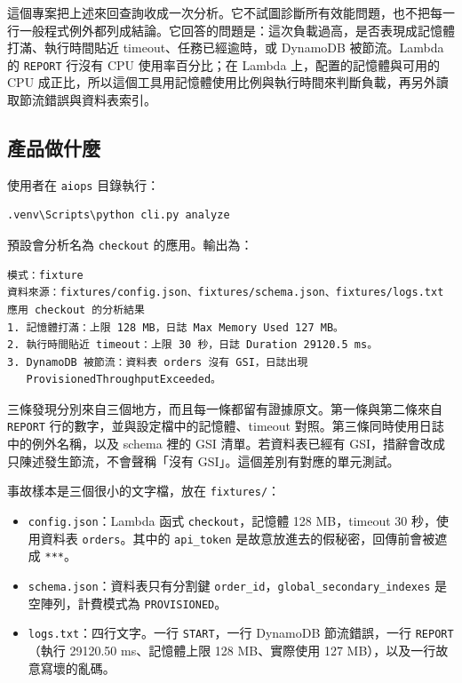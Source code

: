 \documentclass[11pt]{article}
\begin{document}
這個專案把上述來回查詢收成一次分析。它不試圖診斷所有效能問題，也不把每一行一般程式例外都列成結論。它回答的問題是：這次負載過高，是否表現成記憶體打滿、執行時間貼近 timeout、任務已經逾時，或 DynamoDB 被節流。Lambda 的 \texttt{REPORT} 行沒有 CPU 使用率百分比；在 Lambda 上，配置的記憶體與可用的 CPU 成正比，所以這個工具用記憶體使用比例與執行時間來判斷負載，再另外讀取節流錯誤與資料表索引。

\subsection{產品做什麼}

使用者在 \texttt{aiops} 目錄執行：

\begin{verbatim}
.venv\Scripts\python cli.py analyze
\end{verbatim}

預設會分析名為 \texttt{checkout} 的應用。輸出為：

\begin{verbatim}
模式：fixture
資料來源：fixtures/config.json、fixtures/schema.json、fixtures/logs.txt
應用 checkout 的分析結果
1. 記憶體打滿：上限 128 MB，日誌 Max Memory Used 127 MB。
2. 執行時間貼近 timeout：上限 30 秒，日誌 Duration 29120.5 ms。
3. DynamoDB 被節流：資料表 orders 沒有 GSI，日誌出現
   ProvisionedThroughputExceeded。
\end{verbatim}

三條發現分別來自三個地方，而且每一條都留有證據原文。第一條與第二條來自 \texttt{REPORT} 行的數字，並與設定檔中的記憶體、timeout 對照。第三條同時使用日誌中的例外名稱，以及 schema 裡的 GSI 清單。若資料表已經有 GSI，措辭會改成只陳述發生節流，不會聲稱「沒有 GSI」。這個差別有對應的單元測試。

事故樣本是三個很小的文字檔，放在 \texttt{fixtures/}：

\begin{itemize}
    \item \texttt{config.json}：Lambda 函式 \texttt{checkout}，記憶體 128 MB，timeout 30 秒，使用資料表 \texttt{orders}。其中的 \texttt{api\_token} 是故意放進去的假秘密，回傳前會被遮成 \texttt{***}。
    \item \texttt{schema.json}：資料表只有分割鍵 \texttt{order\_id}，\texttt{global\_secondary\_indexes} 是空陣列，計費模式為 \texttt{PROVISIONED}。
    \item \texttt{logs.txt}：四行文字。一行 \texttt{START}，一行 DynamoDB 節流錯誤，一行 \texttt{REPORT}（執行 29120.50 ms、記憶體上限 128 MB、實際使用 127 MB），以及一行故意寫壞的亂碼。
\end{itemize}
\end{document}
